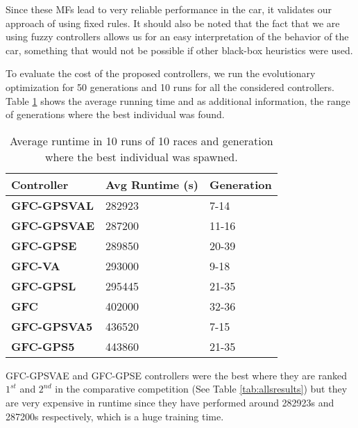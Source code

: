 \documentclass[10pt,journal,compsoc]{IEEEtran}
\begin{document}
Since these MFs lead to very reliable performance in the car, it
validates our approach of using fixed rules. It should
also be noted that the fact that we are using fuzzy controllers allows
us for an easy interpretation of the behavior of the car, something
that would not be possible if other black-box heuristics were used.


To evaluate the cost of the proposed controllers, we run the evolutionary optimization for 50 generations and 10 runs for all the considered controllers.
 Table \ref{tab:time} shows the average running time and  as additional information, the range of generations where the best individual was found.

\begin{table}[!ht]
	\centering
	{\scriptsize
          \caption{Average runtime in 10 runs of 10 races 
            and
                  generation where the best individual was spawned.}
		\label{tab:time}
		\begin{tabular}{|p{2.85cm}|p{2.20cm}|p{1.65cm}|}
			\hline  
			Controller& \textbf{Avg Runtime (s)}&\textbf{Generation}\\
\hline
\hline 	 
 \textbf{{\sf GFC-GPSVAL}} \cite{DBLP:conf/cig/SalemMG19}&282923
&7-14\\	
\textbf{{\sf GFC-GPSVAE}}&287200
&11-16\\
 \textbf{{\sf GFC-GPSE}}&289850
&20-39\\
\textbf{{\sf GFC-VA}} \cite{DBLP:conf/cig/SalemMG19}&293000
&9-18\\
 \textbf{{\sf GFC-GPSL}} \cite{DBLP:conf/cig/SalemMG19}&295445
&21-35\\
\textbf{\textbf{{\sf GFC}}} \cite{salem_cig2018}&402000
                   &32-36\\
\textbf{{\sf GFC-GPSVA5}} \cite{DBLP:conf/cig/SalemMG19}&436520
&7-15\\		
 \textbf{{\sf GFC-GPS5}} \cite{DBLP:conf/cig/SalemMG19}&443860
				&21-35\\	
					
			\hline 
		
		\end{tabular}
		
	}
\end{table} 
{\sf GFC-GPSVAE and {\sf GFC-GPSE} controllers were the best where
they are ranked $1^{st}$ and $2^{nd}$ in the comparative competition (See Table \ref{tab:allsresults}) but they are very expensive in runtime } since they have performed around 282923s and 287200s respectively, which is a
huge training time. 
           
\end{document}
